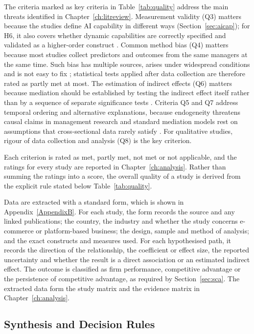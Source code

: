 The criteria marked as key criteria in Table~\ref{tab:quality} address the main threats identified in Chapter~\ref{ch:litreview}. Measurement validity (Q3) matters because the studies define AI capability in different ways (Section~\ref{sec:aicap}); for H6, it also covers whether dynamic capabilities are correctly specified and validated as a higher-order construct \parencite{sarstedt2019}. Common method bias (Q4) matters because most studies collect predictors and outcomes from the same managers at the same time. Such bias has multiple sources, arises under widespread conditions and is not easy to fix \parencite{podsakoff2024}; statistical tests applied after data collection are therefore rated as partly met at most. The estimation of indirect effects (Q6) matters because mediation should be established by testing the indirect effect itself rather than by a sequence of separate significance tests \parencite{zhao2010}. Criteria Q5 and Q7 address temporal ordering and alternative explanations, because endogeneity threatens causal claims in management research \parencite{hill2021} and standard mediation models rest on assumptions that cross-sectional data rarely satisfy \parencite{rohrer2022}. For qualitative studies, rigour of data collection and analysis (Q8) is the key criterion.

Each criterion is rated as met, partly met, not met or not applicable, and the ratings for every study are reported in Chapter~\ref{ch:analysis}. Rather than summing the ratings into a score, the overall quality of a study is derived from the explicit rule stated below Table~\ref{tab:quality}.

Data are extracted with a standard form, which is shown in Appendix~\ref{AppendixB}. For each study, the form records the source and any linked publications; the country, the industry and whether the study concerns e-commerce or platform-based business; the design, sample and method of analysis; and the exact constructs and measures used. For each hypothesised path, it records the direction of the relationship, the coefficient or effect size, the reported uncertainty and whether the result is a direct association or an estimated indirect effect. The outcome is classified as firm performance, competitive advantage or the persistence of competitive advantage, as required by Section~\ref{sec:sca}. The extracted data form the study matrix and the evidence matrix in Chapter~\ref{ch:analysis}.

\subsection{Synthesis and Decision Rules}
\label{sec:synthesis}

